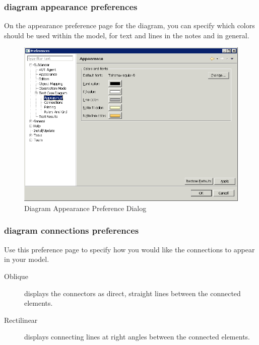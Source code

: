 \subsubsection{\gdcase{} diagram appearance preferences}
On the appearance preference page for the \gdcase{} diagram, you can specify which colors should be used within the model, for text and lines in the notes and in general. 

\begin{figure}[h]
\begin{center}
\includegraphics[width=12.5cm]{Tasks/Preferences/PS/diagramappearanceprefs}
\caption{Diagram Appearance Preference Dialog}
\label{diagramappearanceprefs}
\end{center}
\end{figure}

\subsubsection{\gdcase{} diagram connections preferences}
Use this preference page to specify how you would like the connections to appear in your model. 
\begin{description}
\item [Oblique]{displays the connectors as direct, straight lines between the connected elements. }
\item [Rectilinear]{displays connecting lines at right angles between the connected elements.}
\end{description}


